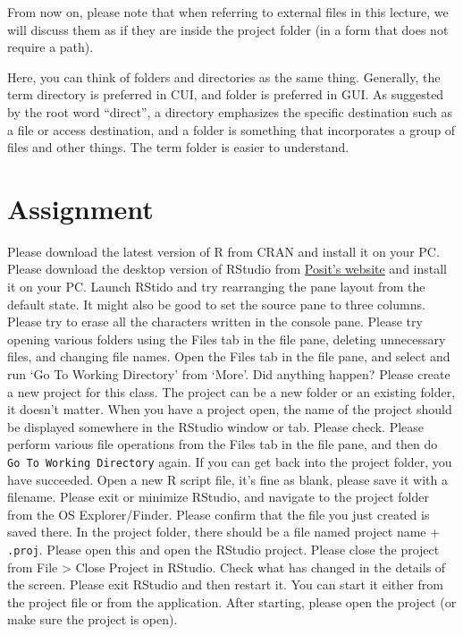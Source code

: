 \documentclass[
  a4paper,
]{book}
\begin{document}
From now on, please note that when referring to external files in this
lecture, we will discuss them as if they are inside the project folder
(in a form that does not require a path).

Here, you can think of folders and directories as the same thing.
Generally, the term directory is preferred in CUI, and folder is
preferred in GUI. As suggested by the root word ``direct'', a directory
emphasizes the specific destination such as a file or access
destination, and a folder is something that incorporates a group of
files and other things. The term folder is easier to understand.

\section{Assignment}\label{assignment}

Please download the latest version of R from CRAN and install it on your
PC. Please download the desktop version of RStudio from
\href{https://posit.co/download/rstudio-desktop/}{Posit's website} and
install it on your PC. Launch RStido and try rearranging the pane layout
from the default state. It might also be good to set the source pane to
three columns. Please try to erase all the characters written in the
console pane. Please try opening various folders using the Files tab in
the file pane, deleting unnecessary files, and changing file names. Open
the Files tab in the file pane, and select and run `Go To Working
Directory' from `More'. Did anything happen? Please create a new project
for this class. The project can be a new folder or an existing folder,
it doesn't matter. When you have a project open, the name of the project
should be displayed somewhere in the RStudio window or tab. Please
check. Please perform various file operations from the Files tab in the
file pane, and then do \texttt{Go\ To\ Working\ Directory} again. If you
can get back into the project folder, you have succeeded. Open a new R
script file, it's fine as blank, please save it with a filename. Please
exit or minimize RStudio, and navigate to the project folder from the OS
Explorer/Finder. Please confirm that the file you just created is saved
there. In the project folder, there should be a file named project name
+ \texttt{.proj}. Please open this and open the RStudio project. Please
close the project from File \textgreater{} Close Project in RStudio.
Check what has changed in the details of the screen. Please exit RStudio
and then restart it. You can start it either from the project file or
from the application. After starting, please open the project (or make
sure the project is open).
\end{document}
